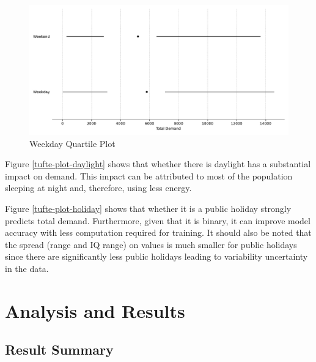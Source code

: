 \documentclass[mstat,12pt]{unswthesis}
\begin{document}
\begin{figure}[H]
\centerline{\includegraphics[width=\columnwidth]{Final Report/Figures/Plots/tufte_plot_is_weekday.pdf}}
\caption{Weekday Quartile Plot}
\label{tufte-plot-weekday}
\end{figure}

Figure \ref{tufte-plot-daylight} shows that whether there is daylight has a substantial impact on demand. This impact can be attributed to most of the population sleeping at night and, therefore, using less energy. \newline

Figure \ref{tufte-plot-holiday} shows that whether it is a public holiday strongly predicts total demand. Furthermore, given that it is binary, it can improve model accuracy with less computation required for training. It should also be noted that the spread (range and IQ range) on values is much smaller for public holidays since there are significantly less public holidays leading to variability uncertainty in the data.

\hypertarget{analysis-and-results}{%
\chapter{Analysis and Results}\label{analysis-and-results}}

\hypertarget{result-summary}{%
\section{Result Summary}\label{result-summary}}
\end{document}
